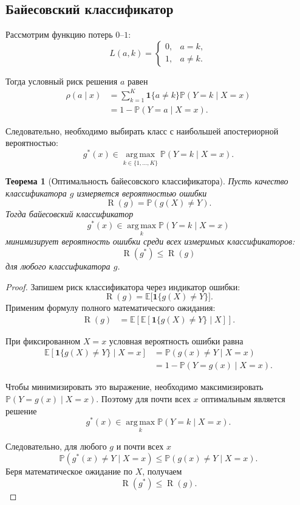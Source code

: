 \documentclass[12pt,a4paper]{article}
\theoremstyle{plain}
\newtheorem{theorem}{Теорема}[section]
\theoremstyle{definition}
\theoremstyle{remark}
\newcommand{\Pp}{\mathbb{P}}
\newcommand{\Ee}{\mathbb{E}}
\newcommand{\ind}{\mathbf{1}}
\newcommand{\argmax}{\operatorname*{arg\,max}}
\newcommand{\Risk}{\operatorname{R}}
\begin{document}
\subsection{Байесовский классификатор}

Рассмотрим функцию потерь $0$--$1$:
\[
    L(a,k)
    =
    \begin{cases}
        0, & a=k,\\
        1, & a\ne k.
    \end{cases}
\]

Тогда условный риск решения $a$ равен
\[
\begin{aligned}
    \rho(a\mid x)
    &=
    \sum_{k=1}^{K}
    \ind\{a\ne k\}\Pp(Y=k\mid X=x)
    \\
    &=
    1-\Pp(Y=a\mid X=x).
\end{aligned}
\]

Следовательно, необходимо выбирать класс с наибольшей апостериорной
вероятностью:
\[
    g^*(x)
    \in
    \argmax_{k\in\{1,\ldots,K\}}
    \Pp(Y=k\mid X=x).
\]

\begin{theorem}[Оптимальность байесовского классификатора]
Пусть качество классификатора $g$ измеряется вероятностью ошибки
\[
    \Risk(g)
    =
    \Pp(g(X)\ne Y).
\]
Тогда байесовский классификатор
\[
    g^*(x)
    \in
    \argmax_k \Pp(Y=k\mid X=x)
\]
минимизирует вероятность ошибки среди всех измеримых классификаторов:
\[
    \Risk(g^*)\le \Risk(g)
\]
для любого классификатора $g$.
\end{theorem}

\begin{proof}
Запишем риск классификатора через индикатор ошибки:
\[
    \Risk(g)
    =
    \Ee\bigl[\ind\{g(X)\ne Y\}\bigr].
\]
Применим формулу полного математического ожидания:
\[
\begin{aligned}
    \Risk(g)
    &=
    \Ee\left[
        \Ee\left[
            \ind\{g(X)\ne Y\}
            \mid X
        \right]
    \right].
\end{aligned}
\]

При фиксированном $X=x$ условная вероятность ошибки равна
\[
\begin{aligned}
    \Ee\left[
        \ind\{g(X)\ne Y\}
        \mid X=x
    \right]
    &=
    \Pp(g(x)\ne Y\mid X=x)
    \\
    &=
    1-\Pp(Y=g(x)\mid X=x).
\end{aligned}
\]

Чтобы минимизировать это выражение, необходимо максимизировать
$\Pp(Y=g(x)\mid X=x)$. Поэтому для почти всех $x$ оптимальным является
решение
\[
    g^*(x)
    \in
    \argmax_k\Pp(Y=k\mid X=x).
\]

Следовательно, для любого $g$ и почти всех $x$
\[
    \Pp(g^*(x)\ne Y\mid X=x)
    \le
    \Pp(g(x)\ne Y\mid X=x).
\]
Беря математическое ожидание по $X$, получаем
\[
    \Risk(g^*)\le \Risk(g).
\]
\end{proof}
\end{document}
